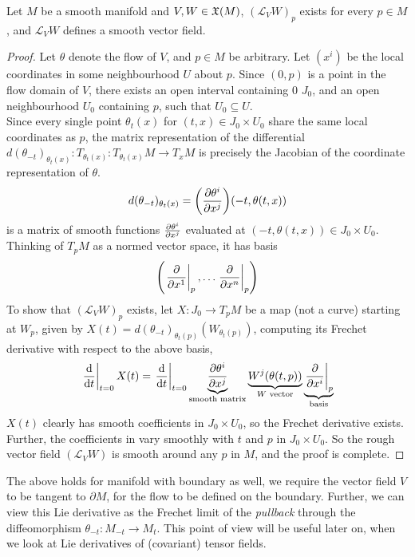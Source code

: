 \documentclass[../main-manifolds.tex]{subfiles}
\begin{document}
\begin{wts}\label{lee-chp9:lemma-9.36} %
    Let $M$ be a smooth manifold and $V,W\in \mathfrak{X}(M)$, $(\mathcal{L}_V W)_p$ exists for every $p\in M$, and $\mathcal{L}_V W$ defines a smooth vector field.
\end{wts}
\begin{proof}
    Let $\theta$ denote the flow of $V$, and $p\in M$ be arbitrary. Let $(x^i)$ be the local coordinates in some neighbourhood $U$ about $p$. Since $(0,p)$ is a point in the flow domain of $V$, there exists an open interval containing $0$ $J_0$, and an open neighbourhood $U_0$ containing $p$, such that $U_0\subseteq U$.\\
    Since every single point $\theta_t(x)$ for $(t,x)\in J_0\times U_0$ share the same local coordinates as $p$, the matrix representation of the differential $d(\theta_{-t})_{\theta_t(x)}: T_{\theta_t(x)}: T_{\theta_t(x)}M \to T_{x}M$ is precisely the Jacobian of the coordinate representation of $\theta$. 
    \[
        d(\theta_{-t})_{\theta_t(x)} = \qty( \pdv{\theta^i}{x^j}) (-t,\theta(t,x))
    \]
    is a matrix of smooth functions $\pdv{\theta^i}{x^j}$ evaluated at $(-t,\theta(t,x))\in J_0\times U_0$. Thinking of $T_pM$ as a normed vector space, it has basis 
    \[
        \qty(\eval{\pdv{x^1}}_p,\ldots \eval{\pdv{x^n}}_p)
    \]
    To show that $(\mathcal{L}_V W)_p$ exists, let $X: J_0\to T_pM$ be a map (not a curve) starting at $W_p$, given by $X(t) = d(\theta_{-t})_{\theta_t(p)}(W_{\theta_t(p)})$, computing its Frechet derivative with respect to the above basis,
    \begin{equation}\label{lee-9.36-coefficients}
        \eval{\dv{t}}_{t=0} X(t) = \eval{\dv{t}}_{t=0} \underbrace{\pdv{\theta^i}{x^j}(-t,\theta(t,p))}_{\text{smooth matrix}} \underbrace{W^j(\theta(t,p))}_{W\text{ vector}} \underbrace{\eval{\pdv{x^i}}_{p}}_{\text{basis}}
    \end{equation}
    $X(t)$ clearly has smooth coefficients in $J_0\times U_0$, so the Frechet derivative exists. Further, the coefficients in  vary smoothly with $t$ and $p$ in $J_0\times U_0$. So the rough vector field $(\mathcal{L}_VW)$ is smooth around any $p$ in $M$, and the proof is complete.
\end{proof}
\begin{remark}
    The above holds for manifold with boundary as well, we require the vector field $V$ to be tangent to $\partial M$, for the flow to be defined on the boundary. Further, we can view this Lie derivative as the Frechet limit of the \emph{pullback} through the diffeomorphism $\theta_{-t}: M_{-t}\to M_{t}$. This point of view will be useful later on, when we look at Lie derivatives of (covariant) tensor fields.
\end{remark}
\end{document}
